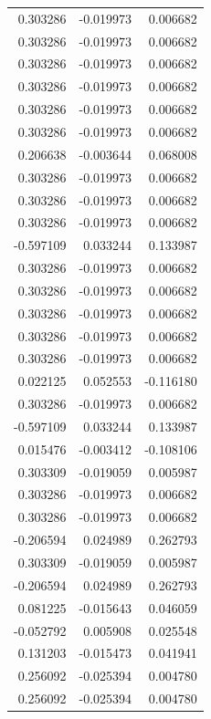 \documentclass[a4paper,twoside,12pt]{book}
\begin{document}
\begin{appendices}
\begin{table}
\begin{tabular}{rrr}
	 0.303286 & -0.019973 &  0.006682 \\
	 0.303286 & -0.019973 &  0.006682 \\
	 0.303286 & -0.019973 &  0.006682 \\
	 0.303286 & -0.019973 &  0.006682 \\
	 0.303286 & -0.019973 &  0.006682 \\
	 0.303286 & -0.019973 &  0.006682 \\
	 0.206638 & -0.003644 &  0.068008 \\
	 0.303286 & -0.019973 &  0.006682 \\
	 0.303286 & -0.019973 &  0.006682 \\
	 0.303286 & -0.019973 &  0.006682 \\
	-0.597109 &  0.033244 &  0.133987 \\
	 0.303286 & -0.019973 &  0.006682 \\
	 0.303286 & -0.019973 &  0.006682 \\
	 0.303286 & -0.019973 &  0.006682 \\
	 0.303286 & -0.019973 &  0.006682 \\
	 0.303286 & -0.019973 &  0.006682 \\
	 0.022125 &  0.052553 & -0.116180 \\
	 0.303286 & -0.019973 &  0.006682 \\
	-0.597109 &  0.033244 &  0.133987 \\
	 0.015476 & -0.003412 & -0.108106 \\
	 0.303309 & -0.019059 &  0.005987 \\
	 0.303286 & -0.019973 &  0.006682 \\
	 0.303286 & -0.019973 &  0.006682 \\
	-0.206594 &  0.024989 &  0.262793 \\
	 0.303309 & -0.019059 &  0.005987 \\
	-0.206594 &  0.024989 &  0.262793 \\
	 0.081225 & -0.015643 &  0.046059 \\
	-0.052792 &  0.005908 &  0.025548 \\
	 0.131203 & -0.015473 &  0.041941 \\
	 0.256092 & -0.025394 &  0.004780 \\
	 0.256092 & -0.025394 &  0.004780 \\
	\bottomrule
\end{tabular}
\end{table}
   

\end{appendices}
\end{document}
